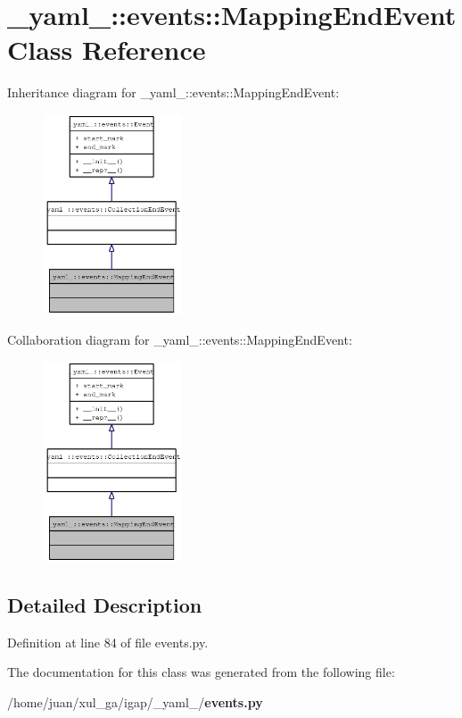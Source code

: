 \section{\_\-yaml\_\-::events::MappingEndEvent Class Reference}
\label{class__yaml___1_1events_1_1MappingEndEvent}
Inheritance diagram for \_\-yaml\_\-::events::MappingEndEvent:\nopagebreak
\begin{figure}[H]
\begin{center}
\leavevmode
\includegraphics[width=117pt]{class__yaml___1_1events_1_1MappingEndEvent__inherit__graph}
\end{center}
\end{figure}
Collaboration diagram for \_\-yaml\_\-::events::MappingEndEvent:\nopagebreak
\begin{figure}[H]
\begin{center}
\leavevmode
\includegraphics[width=117pt]{class__yaml___1_1events_1_1MappingEndEvent__coll__graph}
\end{center}
\end{figure}


\subsection{Detailed Description}


Definition at line 84 of file events.py.

The documentation for this class was generated from the following file:\begin{CompactItemize}
\item 
/home/juan/xul\_\-ga/igap/\_\-yaml\_\-/{\bf events.py}\end{CompactItemize}
